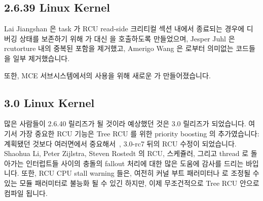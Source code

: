 \subsection{2.6.39 Linux Kernel}

Lai Jiangshan 은 task 가 RCU read-side 크리티컬 섹션 내에서 종료되는 경우에
디버깅 상태를 보존하기 위해  가  대신
 을 호출하도록 만들었으며, Jesper Juhl 은 rcutorture
내의 중복된  포함을 제거했고, Amerigo Wang 은 
로부터 의미없는 코드들을 일부 제거했습니다.

또한, MCE 서브시스템에서의 사용을 위해 새로운  가
만들어졌습니다.

\subsection{3.0 Linux Kernel}

많은 사람들이 2.6.40 릴리즈가 될 것이라 예상했던 것은 3.0 릴리즈가 되었습니다.
여기서 가장 중요한 RCU 기능은 Tree RCU 를 위한 priority boosting 의
추가였습니다: 계획됐던 것보다 여러면에서
중요해서~\cite{PaulEMcKenney2011RCU3.0trainwreck}, 3.0-rc7 뒤의 RCU 수정이
되었습니다.
Shaohua Li, Peter Zijlstra, Steven Rostedt 의 RCU, 스케쥴러, 그리고 thread 로
돌아가는 인터럽트들 사이의 충돌의 fallout 처리에 대한 많은 도움에 감사를 드리는
바입니다.
또한, RCU CPU stall warning 들은, 여전히 커널 부트 패러미터나  로
조정될 수 있는  모듈 패러미터로 불능화 될 수 있긴
하지만, 이제 무조건적으로 Tree RCU 안으로 컴파일 됩니다.


